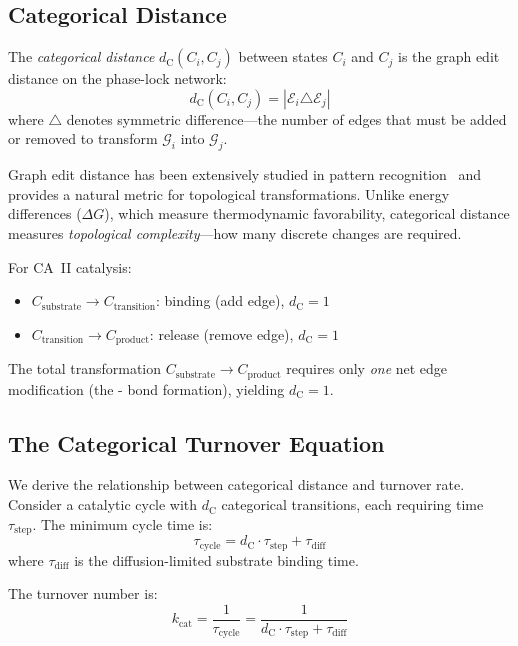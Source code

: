 \documentclass[twocolumn,amsmath,amssymb,aps,prb,superscriptaddress,longbibliography]{revtex4-2}
\newcommand{\dC}{d_{\mathrm{C}}}
\newcommand{\kcat}{k_{\mathrm{cat}}}
\newcommand{\calG}{\mathcal{G}}
\newcommand{\calE}{\mathcal{E}}
\begin{document}
\subsection{Categorical Distance}
\label{sec:categorical-distance}

The \emph{categorical distance} $\dC(C_i, C_j)$ between states $C_i$ and $C_j$ is the graph edit distance on the phase-lock network:
\begin{equation}
\dC(C_i, C_j) = |\calE_i \triangle \calE_j|
\label{eq:dc-def}
\end{equation}
where $\triangle$ denotes symmetric difference---the number of edges that must be added or removed to transform $\calG_i$ into $\calG_j$.

Graph edit distance has been extensively studied in pattern recognition~\cite{Gao2010} and provides a natural metric for topological transformations. Unlike energy differences ($\Delta G$), which measure thermodynamic favorability, categorical distance measures \emph{topological complexity}---how many discrete changes are required.

For CA~II catalysis:
\begin{itemize}
\item $C_{\text{substrate}} \to C_{\text{transition}}$:  binding (add  edge), $\dC = 1$
\item $C_{\text{transition}} \to C_{\text{product}}$:  release (remove  edge), $\dC = 1$
\end{itemize}

The total transformation $C_{\text{substrate}} \to C_{\text{product}}$ requires only \emph{one} net edge modification (the - bond formation), yielding $\dC = 1$.

\subsection{The Categorical Turnover Equation}

We derive the relationship between categorical distance and turnover rate. Consider a catalytic cycle with $\dC$ categorical transitions, each requiring time $\tau_{\text{step}}$. The minimum cycle time is:
\begin{equation}
\tau_{\text{cycle}} = \dC \cdot \tau_{\text{step}} + \tau_{\text{diff}}
\label{eq:tau-cycle}
\end{equation}
where $\tau_{\text{diff}}$ is the diffusion-limited substrate binding time.

The turnover number is:
\begin{equation}
\kcat = \frac{1}{\tau_{\text{cycle}}} = \frac{1}{\dC \cdot \tau_{\text{step}} + \tau_{\text{diff}}}
\label{eq:kcat-full}
\end{equation}
\end{document}
